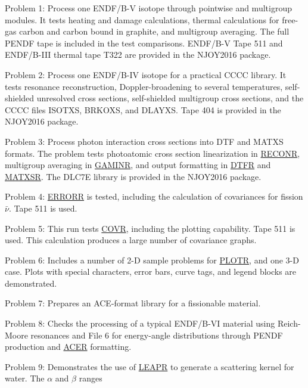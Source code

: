 \begin{description}
\begin{singlespace}
\item[Problem 1:]  Process one ENDF/B-V isotope through pointwise
   and multigroup modules.  It tests heating and damage
   calculations, thermal calculations for free-gas carbon and
   carbon bound in graphite, and multigroup averaging.  The
   full PENDF tape is included in the test comparisons.  ENDF/B-V
   Tape 511 and ENDF/B-III thermal tape T322 are provided in the
   NJOY2016 package.
\item[Problem 2:]  Process one ENDF/B-IV isotope for a practical
   CCCC library.  It tests resonance reconstruction,
   Doppler-broadening to several temperatures, self-shielded unresolved
   cross sections, self-shielded multigroup cross sections, and the
   CCCC files ISOTXS, BRKOXS, and DLAYXS.  Tape 404 is provided in the
   NJOY2016 package.
\item[Problem 3:]  Process photon interaction cross sections
   into DTF and MATXS formats.  The problem tests photoatomic cross
   section linearization in \hyperlink{sRECONRhy}{RECONR},
   multigroup averaging in \hyperlink{sGAMINRhy}{GAMINR}, and
   output formatting in \hyperlink{sDTFRhy}{DTFR} and
   \hyperlink{sMATXSRhy}{MATXSR}.  The
   DLC7E library is provided in the NJOY2016 package.
\item[Problem 4:]  \hyperlink{sERRORRhy}{ERRORR} is tested,
   including the calculation of
   covariances for fission $\bar{\nu}$.  Tape 511 is used.
\item[Problem 5:]  This run tests \hyperlink{sCOVRhy}{COVR},
   including the plotting
   capability.  Tape 511 is used. This calculation produces a
   large number of covariance graphs.
\item[Problem 6:]  Includes a number of 2-D sample problems for
   \hyperlink{sPLOTRhy}{PLOTR}, and one 3-D case.  Plots with
   special characters,
   error bars, curve tags, and legend blocks are demonstrated.
\item[Problem 7:]  Prepares an ACE-format library for a fissionable
   material.
\item[Problem 8:] Checks the processing of a typical ENDF/B-VI
   material using Reich-Moore resonances and File 6 for energy-angle
   distributions through PENDF production and
   \hyperlink{sACERhy}{ACER} formatting.
\item[Problem 9:] Demonstrates the use of
   \hyperlink{sLEAPRhy}{LEAPR} to generate
   a scattering kernel for water.  The $\alpha$ and $\beta$ ranges

\end{singlespace}
\end{description}
